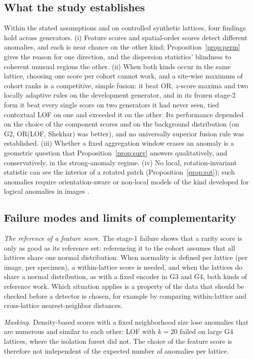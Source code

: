 \documentclass[preprint,review,12pt]{elsarticle}
\begin{document}
\subsection{What the study establishes}
Within the stated assumptions and on controlled synthetic lattices, four findings hold across generators. (i) Feature scores and spatial-order scores detect different anomalies, and each is near chance on the other kind; Proposition~\ref{prop:perm} gives the reason for one direction, and the dispersion statistics' blindness to coherent unusual regions the other. (ii) When both kinds occur in the same lattice, choosing one score per cohort cannot work, and a site-wise maximum of cohort ranks is a competitive, simple fusion: it beat OR, $z$-score maxima and two locally adaptive rules on the development generator, and in its frozen stage-2 form it beat every single score on two generators it had never seen, tied contextual LOF on one and exceeded it on the other. Its performance depended on the choice of the component scores and on the background distribution (on G2, OR(LOF, Shekhar) was better), and no universally superior fusion rule was established. (iii) Whether a fixed aggregation window erases an anomaly is a geometric question that Proposition~\ref{prop:surv} answers qualitatively, and conservatively, in the strong-anomaly regime. (iv) No local, rotation-invariant statistic can see the interior of a rotated patch (Proposition~\ref{prop:rot}); such anomalies require orientation-aware or non-local models of the kind developed for logical anomalies in images \citep{Bergmann2022,Batzner2024}.

\subsection{Failure modes and limits of complementarity}
\emph{The reference of a feature score.} The stage-1 failure shows that a rarity score is only as good as its reference set: referencing it to the cohort assumes that all lattices share one normal distribution. When normality is defined per lattice (per image, per specimen), a within-lattice score is needed, and when the lattices do share a normal distribution, as with a fixed encoder in G3 and G4, both kinds of reference work. Which situation applies is a property of the data that should be checked before a detector is chosen, for example by comparing within-lattice and cross-lattice nearest-neighbor distances.

\emph{Masking.} Density-based scores with a fixed neighborhood size lose anomalies that are numerous and similar to each other: LOF with $k=20$ failed on large G4 lattices, where the isolation forest did not. The choice of the feature score is therefore not independent of the expected number of anomalies per lattice.
\end{document}
